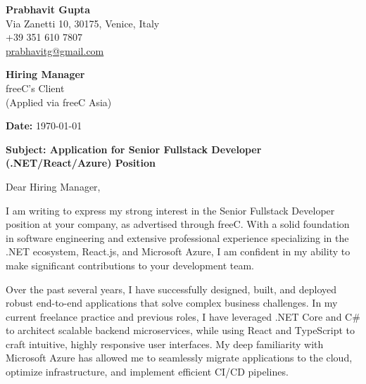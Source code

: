 \documentclass[11pt,a4paper]{article}
\begin{document}
\begin{flushleft}
\textbf{Prabhavit Gupta} \\
Via Zanetti 10, 30175, Venice, Italy \\
+39 351 610 7807 \\
\href{mailto:prabhavitg@gmail.com}{prabhavitg@gmail.com}
\end{flushleft}

\vspace{2em}

\begin{flushleft}
\textbf{Hiring Manager} \\
freeC's Client \\
(Applied via freeC Asia)
\end{flushleft}

\vspace{1em}

\noindent \textbf{Date:} \today

\vspace{2em}

\noindent \textbf{Subject: Application for Senior Fullstack Developer (.NET/React/Azure) Position}

\vspace{1em}

\noindent Dear Hiring Manager,

\vspace{1em}

\noindent I am writing to express my strong interest in the Senior Fullstack Developer position at your company, as advertised through freeC. With a solid foundation in software engineering and extensive professional experience specializing in the .NET ecosystem, React.js, and Microsoft Azure, I am confident in my ability to make significant contributions to your development team.

\vspace{1em}

\noindent Over the past several years, I have successfully designed, built, and deployed robust end-to-end applications that solve complex business challenges. In my current freelance practice and previous roles, I have leveraged .NET Core and C\# to architect scalable backend microservices, while using React and TypeScript to craft intuitive, highly responsive user interfaces. My deep familiarity with Microsoft Azure has allowed me to seamlessly migrate applications to the cloud, optimize infrastructure, and implement efficient CI/CD pipelines.

\vspace{1em}
\end{document}
